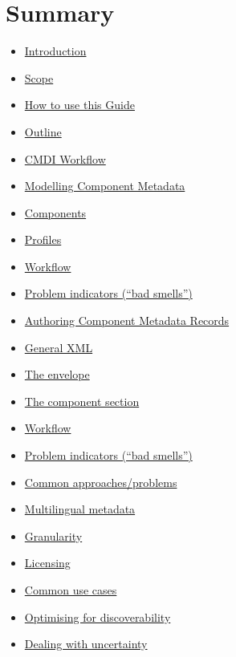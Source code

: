 \documentclass[]{article}
\date{}
\providecommand{\tightlist}{%
  \setlength{\itemsep}{0pt}\setlength{\parskip}{0pt}}
\begin{document}
\section{Summary}\label{summary}

\begin{itemize}
\tightlist
\item
  \href{README.md}{Introduction}
\item
  \href{introduction/scope.md}{Scope}
\item
  \href{how-to-use-this-guide.md}{How to use this Guide}
\item
  \href{introduction/outline.md}{Outline}
\item
  \href{cmdi_workflow.md}{CMDI Workflow}
\item
  \href{modelling_component_metadata/README.md}{Modelling Component
  Metadata}
\item
  \href{modelling_component_metadata/components.md}{Components}
\item
  \href{modelling_component_metadata/profiles.md}{Profiles}
\item
  \href{modelling_component_metadata/workflow.md}{Workflow}
\item
  \href{modelling_component_metadata/problem_indicators_bad_smells.md}{Problem
  indicators (``bad smells'')}
\item
  \href{authoring_component_metadata_records/README.md}{Authoring
  Component Metadata Records}
\item
  \href{authoring_component_metadata_records/general_xml.md}{General
  XML}
\item
  \href{authoring_component_metadata_records/the_envelope.md}{The
  envelope}
\item
  \href{authoring_component_metadata_records/the_component_section.md}{The
  component section}
\item
  \href{authoring_component_metadata_records/workflow.md}{Workflow}
\item
  \href{authoring_component_metadata_records/problem_indicators_bad_smells.md}{Problem
  indicators (``bad smells'')}
\item
  \href{common_approachesproblems/README.md}{Common approaches/problems}
\item
  \href{common_approachesproblems/multilingual_metadata.md}{Multilingual
  metadata}
\item
  \href{common_approachesproblems/granularity.md}{Granularity}
\item
  \href{common_approachesproblems/licensing.md}{Licensing}
\item
  \href{common_approachesproblems/common_use_cases.md}{Common use cases}
\item
  \href{optimising-for-discoverability.md}{Optimising for
  discoverability}
\item
  \href{common_approachesproblems/dealing-with-uncertainty.md}{Dealing
  with uncertainty}
\end{itemize}
\end{document}

